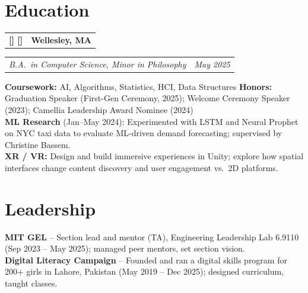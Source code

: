 \documentclass[11pt]{article}
\makeatletter
\newcommand{\FirstBig}[1]{%
  \StrLeft{#1}{1}[\FirstChar]%
  \StrGobbleLeft{#1}{1}[\RestChars]%
  {\large\bfseries\FirstChar}\RestChars%
}
\newcommand{\twocol}[2]{%
  \begin{tabularx}{\linewidth}{@{}X r@{}}
    \textbf{\FirstBig{#1}} & \textbf{#2} \\
  \end{tabularx}
}
\newcommand{\roleline}[2]{%
  \begin{tabularx}{\linewidth}{@{}X r@{}}
    \textit{#1} & \textit{#2} \\
  \end{tabularx}
}
\makeatother
\begin{document}
\section{Education}

\twocol{Wellesley College}{Wellesley, MA}
\roleline{B.A.\ in Computer Science, Minor in Philosophy}{May 2025}
\vspace{1pt}
\textbf{Coursework:} AI, Algorithms, Statistics, HCI, Data Structures \quad
\textbf{Honors:} Graduation Speaker (First-Gen Ceremony, 2025); Welcome Ceremony Speaker (2023); Camellia Leadership Award Nominee (2024) \\[2pt]
\textbf{ML Research} (Jan--May 2024): Experimented with LSTM and Neural Prophet on NYC taxi data to evaluate ML-driven demand forecasting; supervised by Christine Bassem. \\[2pt]
\textbf{XR / VR:} Design and build immersive experiences in Unity; explore how spatial interfaces change content discovery and user engagement vs.\ 2D platforms.

\section{Leadership}
\textbf{MIT GEL} -- Section lead and mentor (TA), Engineering Leadership Lab 6.9110 (Sep 2023 -- May 2025); managed peer mentors, set section vision. \\
\textbf{Digital Literacy Campaign} -- Founded and ran a digital skills program for 200+ girls in Lahore, Pakistan (May 2019 -- Dec 2025); designed curriculum, taught classes.
\end{document}
